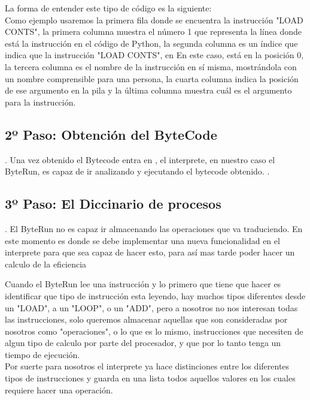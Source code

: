 
La forma de entender este tipo de código es la siguiente:\\

Como ejemplo usaremos la primera fila donde se encuentra la instrucción "LOAD CONTS", la primera columna muestra el número 1 que representa la línea donde está la instrucción en el código de Python, la segunda columna es un índice que indica que la instrucción "LOAD CONTS", en En este caso, está en la posición 0, la tercera columna es el nombre de la instrucción en sí misma, mostrándola con un nombre comprensible para una persona, la cuarta columna indica la posición de ese argumento en la pila y la última columna muestra cuál es el argumento para la instrucción.\\

\subsection{2º Paso: Obtención del ByteCode}.
Una vez obtenido el Bytecode entra en , el interprete, en nuestro caso el ByteRun, es capaz de ir analizando y ejecutando el bytecode obtenido. .

\subsection{3º Paso: El Diccinario de procesos}.
El ByteRun no es capaz ir almacenando las operaciones que va traduciendo. En este momento es donde se debe implementar una nueva funcionalidad en el interprete para que sea capaz de hacer esto, para así mas tarde poder hacer un calculo de la eficiencia

Cuando el ByteRun lee una instrucción y lo primero que tiene que hacer es identificar que tipo de instrucción esta leyendo, hay muchos tipos diferentes desde un "LOAD", a un "LOOP", o un "ADD", pero a nosotros no nos interesan todas las instrucciones, solo queremos almacenar aquellas que son consideradas por nosotros como "operaciones", o lo que es lo mismo, instrucciones que necesiten de algun tipo de calculo por parte del procesador, y que por lo tanto tenga un tiempo de ejecución.\\

Por suerte para nosotros el interprete ya hace distinciones entre los diferentes tipos de instrucciones y guarda en una lista todos aquellos valores en los cuales requiere hacer una operación.\\

